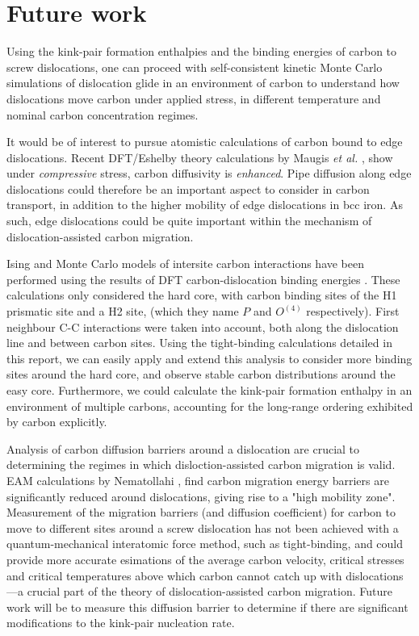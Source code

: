 \documentclass[a4paper,12pt,oneside,print,numbered,index,PageStyleIII]{PhDThesisPSnPDF}
\begin{document}
\section{Future work}
\label{sec:org10cb741}

Using the kink-pair formation enthalpies and the binding energies of carbon to screw dislocations, one can proceed
with self-consistent kinetic Monte Carlo simulations of dislocation glide in an environment of carbon to
understand how dislocations move carbon under applied stress, in different temperature
and nominal carbon concentration regimes.


It would be of interest to pursue atomistic calculations of carbon bound to edge
dislocations. Recent DFT/Eshelby theory calculations by Maugis \emph{et al.} \cite{Maugis2020}, show
under \emph{compressive} stress, carbon diffusivity is \emph{enhanced}. Pipe diffusion along edge
dislocations could therefore be an important aspect to consider in carbon transport, in addition
to the higher mobility of edge dislocations in bcc iron. As such, edge dislocations could be quite
important within the mechanism of dislocation-assisted carbon migration.

Ising and Monte Carlo models of intersite carbon interactions have been performed using the
results of DFT carbon-dislocation binding energies \cite{Lthi2019}. These calculations only
considered the hard core, with carbon binding sites of the H1 prismatic site and a H2 site, (which
they name \(P\) and \(O^{(4)}\) respectively). First neighbour C-C interactions were taken
into account, both along the dislocation line and between carbon sites. Using the tight-binding
calculations detailed in this report, we can easily apply and extend this analysis to consider more
binding sites around the hard core, and observe stable carbon distributions around the
easy core. Furthermore, we could calculate the kink-pair formation enthalpy in an
environment of multiple carbons, accounting for the long-range ordering exhibited by
carbon explicitly.


Analysis of carbon diffusion barriers around a dislocation are crucial to determining
the regimes in which disloction-assisted carbon migration is valid. EAM calculations by
Nematollahi \cite{Nematollahi2016}, find carbon migration energy barriers are
significantly reduced around dislocations, giving rise to a "high mobility zone".
Measurement of the migration barriers (and diffusion coefficient) for carbon to move to
different sites around a screw dislocation has not been achieved with a
quantum-mechanical interatomic force method, such as tight-binding, and could provide more accurate
esimations of the average carbon velocity, critical stresses and critical temperatures
above which carbon cannot catch up with dislocations---a crucial part of the theory of
dislocation-assisted carbon migration. Future work will be to measure this diffusion
barrier to determine if there are significant modifications to the kink-pair nucleation
rate.
\end{document}
